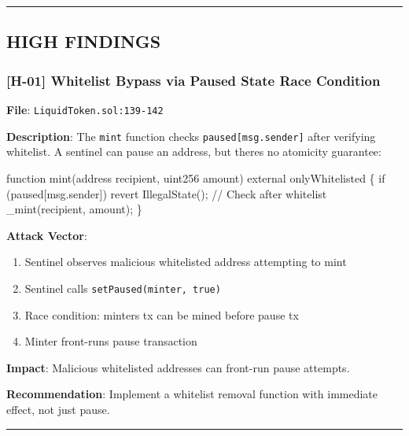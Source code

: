 \documentclass[
]{article}
\newenvironment{Shaded}{}{}
\newcommand{\NormalTok}[1]{#1}
\providecommand{\tightlist}{%
  \setlength{\itemsep}{0pt}\setlength{\parskip}{0pt}}
\begin{document}
\begin{center}\rule{0.5\linewidth}{0.5pt}\end{center}

\subsection{HIGH FINDINGS}\label{high-findings}

\subsubsection{{[}H-01{]} Whitelist Bypass via Paused State Race
Condition}\label{h-01-whitelist-bypass-via-paused-state-race-condition}

\textbf{File}: \texttt{LiquidToken.sol:139-142}

\textbf{Description}: The \texttt{mint} function checks
\texttt{paused{[}msg.sender{]}} after verifying whitelist. A sentinel
can pause an address, but there\textquotesingle s no atomicity
guarantee:

\begin{Shaded}
\begin{Highlighting}[]
\NormalTok{function mint(address recipient, uint256 amount) external onlyWhitelisted \{}
\NormalTok{    if (paused[msg.sender]) revert IllegalState();  // Check after whitelist}
\NormalTok{    \_mint(recipient, amount);}
\NormalTok{\}}
\end{Highlighting}
\end{Shaded}

\textbf{Attack Vector}:

\begin{enumerate}
\def\labelenumi{\arabic{enumi}.}
\tightlist
\item
  Sentinel observes malicious whitelisted address attempting to mint
\item
  Sentinel calls \texttt{setPaused(minter,\ true)}
\item
  Race condition: minter\textquotesingle s tx can be mined before pause
  tx
\item
  Minter front-runs pause transaction
\end{enumerate}

\textbf{Impact}: Malicious whitelisted addresses can front-run pause
attempts.

\textbf{Recommendation}: Implement a whitelist removal function with
immediate effect, not just pause.

\begin{center}\rule{0.5\linewidth}{0.5pt}\end{center}
\end{document}
